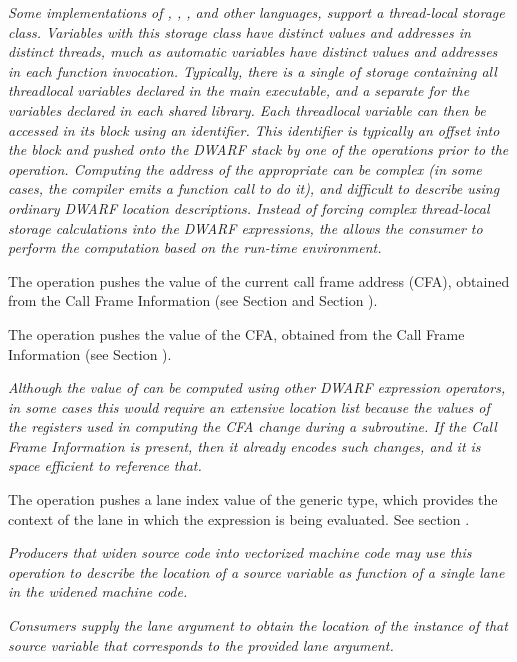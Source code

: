 \begin{enumerate}[1. ]
\textit{Some implementations of 
, , , and other 
languages, support a 
thread-local storage class. Variables with this storage class
have distinct values and addresses in distinct threads, much
as automatic variables have distinct values and addresses in
each function invocation. Typically, there is a single 
of storage containing all thread\dash local variables declared in
the main executable, and a separate  for the variables
declared in each shared library. Each 
thread\dash local variable can then be accessed in its block using an
identifier. This identifier is typically an offset into the block and 
pushed onto the DWARF stack by one of the 
\DWOPconstnx{} operations prior to the
\DWOPformtlsaddress{} operation. 
Computing the address of
the appropriate  can be complex (in some cases, the
compiler emits a function call to do it), and difficult
to describe using ordinary DWARF location descriptions.
Instead of    forcing complex thread-local storage calculations into 
the DWARF expressions, the \DWOPformtlsaddress{} allows the consumer 
to perform the computation based on the run-time environment.}

\itembfnl{\DWOPcallframecfaTARG}
The \DWOPcallframecfaNAME{} operation pushes the value of the current
call frame address (CFA), obtained from the Call Frame Information
(see Section  and Section
).

The  
operation pushes the value of the
CFA, obtained from the Call Frame Information 
(see Section ).

\textit{Although the value of \DWATframebase{}
can be computed using other DWARF expression operators,
in some cases this would require an extensive location list
because the values of the registers used in computing the
CFA change during a subroutine. If the 
Call Frame Information 
is present, then it already encodes such changes, and it is
space efficient to reference that.}

\bb
\itembfnl{\DWOPpushlaneTARG}
The \DWOPpushlaneNAME{} operation pushes a lane index value 
of the generic type, which provides the context of the lane in 
which the expression is being evaluated. 
See section .

\textit{Producers that widen source code into vectorized machine 
code may use this operation to describe the location of a source 
variable as function of a single lane in the widened machine code.}

\textit{Consumers supply the lane argument to obtain the 
location of the instance of that source variable that corresponds 
to the provided lane argument.}
\eb

\end{enumerate}

